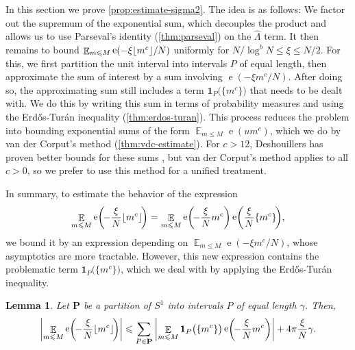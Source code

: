 \documentclass[letterpaper, 12pt]{article}
\theoremstyle{plain}
\newtheorem{Lemma}[Theorem]{Lemma}
\theoremstyle{definition}
\theoremstyle{plain}
\theoremstyle{plain}
\numberwithin{equation}{section}
\newcommand{\Erdos}{Erd\H{o}s}
\newcommand{\Turan}{Tur{\'a}n}
\renewcommand{\leq}{\leqslant}
\newcommand{\E}{\mathbb{E}}
\newcommand{\1}{\textbf{1}}
\DeclarePairedDelimiter\floor{\lfloor}{\rfloor}
\DeclareMathOperator{\e}{e}
\begin{document}
In this section we prove \cref{prop:estimate-sigma2}. The idea is as follows: We factor out the supremum of the exponential sum, which decouples the product and allows us to use Parseval's identity (\cref{thm:parseval}) on the $\hat{\Lambda}$ term. It then remains to bound $\mathop{\E}_{m \leq M} \e(-\xi \floor{m^c}/N)$ uniformly for $N/\log^b N \leq \xi \leq N/2$. For this, we first partition the unit interval into intervals \(P\) of equal length, then approximate the sum of interest by a sum involving $\e(-\xi m^c/N)$. After doing so, the approximating sum still includes a term $\1_{P}\bigl(\{m^c\}\bigr)$ that needs to be dealt with. We do this by writing this sum in terms of probability measures and using the \Erdos-\Turan{} inequality (\cref{thm:erdos-turan}). This process reduces the problem into bounding exponential sums of the form $\mathop{\E}_{m \leq M} \e(um^c)$, which we do by van der Corput's method (\cref{thm:vdc-estimate}). For \(c > 12\), Deshouillers has proven better bounds for these sums \cite{deshouillers1973}, but van der Corput's method applies to all $c > 0$, so we prefer to use this method for a unified treatment. 

In summary, to estimate the behavior of the expression
\[
    \mathop{\E}_{m \leq M} \e\biggl(\! -\frac{\xi}{N} \floor{m^c} \!\biggr) = \mathop{\E}_{m \leq M} \e\biggl(\! -\frac{\xi}{N} m^c \biggr) \e\biggl(\frac{\xi}{N} \{m^c\} \!\biggr),
\] 
we bound it by an expression depending on \(\mathop{\E}_{m \leq M} \e(-\xi m^c/N)\), whose asymptotics are more tractable. However, this new expression contains the problematic term $\1_{P}\bigl(\{m^c\}\bigr)$, which we deal with by applying the \Erdos-\Turan{} inequality.

\begin{Lemma}\label{lem:partition-bound} 
    Let \(\textbf{P}\) be a partition of \(S^1\) into intervals \(P\) of equal length \(\gamma\). Then,
    \[
        \biggl\lvert \mathop{\E}_{m \leq M} \e\biggl(\! -\frac{\xi}{N} \floor{m^c} \!\biggr) \biggr\rvert 
        \leq \sum_{P \in \textbf{P}}\: \biggl\lvert \mathop{\E}_{m \leq M} \1_{P}\bigl(\{m^c\}\bigr) \e\biggl(\! -\frac{\xi}{N} m^c \biggr) \biggr\rvert + 4\pi\frac{\xi}{N} \gamma.
    \]
\end{Lemma}
\end{document}
